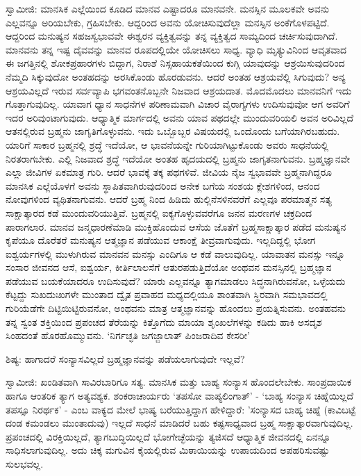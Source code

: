 ಸ್ವಾಮೀಜಿ: ಮಾನಸಿಕ ಎಲ್ಲೆಯಿಂದ ಕೂಡಿದ ಮಾನವ ಎಷ್ಟಾದರೂ ಮಾನವನೇ. ಮನಸ್ಸಿನ ಮೂಲಕವೇ ಅವನು ಎಲ್ಲವನ್ನೂ ಅರಿಯಬೇಕು, ಗ್ರಹಿಸಬೇಕು. ಆದ್ದರಿಂದ ಅವನು ಯೋಚಿಸುವುದೆಲ್ಲಾ ಮನಸ್ಸಿನ ಅಂಕೆಗೊಳಪಟ್ಟಿದೆ. ಆದ್ದರಿಂದ ಮನುಷ್ಯನ ಸಹಜಸ್ವಭಾವವೇ ಈಶ್ವರನ ವ್ಯಕ್ತಿತ್ವವನ್ನು ತನ್ನ ವ್ಯಕ್ತಿತ್ವದ ಸಾಮ್ಯದಿಂದ ಚರ್ಚಿಸುವುದಾಗಿದೆ. ಮಾನವನು ತನ್ನ ಇಷ್ಟ ದೈವವನ್ನು ಮಾನವ ರೂಪದಲ್ಲಿಯೇ ಯೋಚಿಸಲು ಸಾಧ್ಯ. ವ್ಯಾಧಿ ಮೃತ್ಯುವಿನಿಂದ ಆವೃತವಾದ ಈ ಜಗತ್ತಿನಲ್ಲಿ ಶೋಕಪ್ರಹಾರಗಳು ಬಿದ್ದಾಗ, ನಿರಾಶೆ ನಿಸ್ಸಹಾಯಕತೆಯಿಂದ ಕುಗ್ಗಿ ಯಾವುದನ್ನು ಆಶ್ರಯಿಸುವುದರಿಂದ ನೆಮ್ಮದಿ ಸಿಕ್ಕುವುದೋ ಅಂತಹದನ್ನು ಅರಸಿಕೊಂಡು ಹೊರಡುವನು. ಆದರೆ ಅಂತಹ ಆಶ್ರಯವೆಲ್ಲಿ ಸಿಗುವುದು? ಅನ್ಯ ಆಶ್ರಯವಿಲ್ಲದೆ ಇರುವ ಸರ್ವವ್ಯಾಪಿ ಭಗವಂತನೊಬ್ಬನೇ ನಿಜವಾದ ಆಶ್ರಯದಾತ. ಮೊದಮೊದಲು ಮಾನವನಿಗೆ ಇದು ಗೊತ್ತಾಗುವುದಿಲ್ಲ. ಯಾವಾಗ ಧ್ಯಾನ ಸಾಧನೆಗಳ ಪರಿಣಾಮವಾಗಿ ವಿಚಾರ ವೈರಾಗ್ಯಗಳು ಉದಿಸುವುವೋ ಆಗ ಅವರಿಗೆ ಇದರ ಅರಿವುಂಟಾಗುವುದು. ಆಧ್ಯಾತ್ಮಿಕ ಮಾರ್ಗದಲ್ಲಿ ಅವನು ಯಾವ ಪಥದಲ್ಲೇ ಮುಂದುವರಿಯಲಿ ಅವನ ಅರಿವಿಲ್ಲದೆ ಆತನಲ್ಲಿರುವ ಬ್ರಹ್ಮನು ಜಾಗೃತಿಗೊಳ್ಳುವನು. ಇದು ಒಬ್ಬೊಬ್ಬರ ವಿಷಯದಲ್ಲಿ ಒಂದೊಂದು ಬಗೆಯಾಗಿರಬಹುದು. ಯಾರಿಗೆ ಸಾಕಾರ ಬ್ರಹ್ಮನಲ್ಲಿ ಶ್ರದ್ಧೆ ಇದೆಯೋ, ಆ ಭಾವನೆಯನ್ನೇ ಗುರಿಯಾಗಿಟ್ಟುಕೊಂಡು ಅವರು ಸಾಧನೆಯಲ್ಲಿ ನಿರತರಾಗಬೇಕು. ಎಲ್ಲಿ ನಿಜವಾದ ಶ್ರದ್ಧೆ ಇದೆಯೋ ಅಂತಹ ಹೃದಯದಲ್ಲಿ ಬ್ರಹ್ಮನು ಜಾಗೃತನಾಗುವನು. ಬ್ರಹ್ಮಜ್ಞಾನವೇ ಎಲ್ಲಾ ಜೀವಿಗಳ ಏಕಮಾತ್ರ ಗುರಿ. ಆದರೆ ಭಾವಕ್ಕೆ ತಕ್ಕ ಪಥಗಳಿವೆ. ಜೀವಿಯ ನೈಜ ಸ್ವಭಾವವೇ ಬ್ರಹ್ಮನಾಗಿದ್ದರೂ ಮಾನಸಿಕ ಎಲ್ಲೆಯೊಳಗೆ ಅವನು ಸ್ಥಾಪಿತವಾಗಿರುವುದರಿಂದ ಅನೇಕ ಬಗೆಯ ಸಂಶಯ ಕ್ಲೇಶಗಳಿಂದ, ಆನಂದ ನೋವುಗಳಿಂದ ವ್ಯಥಿತನಾಗುವನು. ಆದರೆ ಬ್ರಹ್ಮ ನಿಂದ ಹಿಡಿದು ಹುಲ್ಲಿನೆಸಳಿನವರೆಗೆ ಎಲ್ಲವೂ ಪರಮಾತ್ಮನ ಸತ್ಯ ಸಾಕ್ಷಾತ್ಕಾರದ ಕಡೆ ಮುಂದುವರಿಯುತ್ತಿವೆ. ಬ್ರಹ್ಮನಲ್ಲಿ ಐಕ್ಯಗೊಳ್ಳುವವರೆಗೂ ಜನನ ಮರಣಗಳ ಚಕ್ರದಿಂದ ಪಾರಾಗಲಾರ. ಮಾನವ ಜನ್ಮಧಾರಣೆಮಾಡಿ ಮುಕ್ತಿಹೊಂದುವ ಆಸೆಯ ಜೊತೆಗೆ ಬ್ರಹ್ಮಸಾಕ್ಷಾತ್ಕಾರ ಪಡೆದ ಮನುಷ್ಯನ ಕೃಪೆಯೂ ದೊರೆತರೆ ಮನುಷ್ಯನ ಆತ್ಮಜ್ಞಾನ ಪಡೆಯುವ ಆಕಾಂಕ್ಷೆ ತೀವ್ರವಾಗುವುದು. ಇಲ್ಲದಿದ್ದಲ್ಲಿ ಭೋಗ ಐಶ್ವರ್ಯಗಳಲ್ಲಿ ಮುಳುಗಿರುವ ಮಾನವನ ಮನಸ್ಸು ಎಂದಿಗೂ ಆ ಕಡೆ ವಾಲುವುದಿಲ್ಲ. ಯಾವಾತನ ಮನಸ್ಸು ಇನ್ನೂ ಸಂಸಾರ ಜೀವನದ ಆಸೆ, ಐಶ್ವರ್ಯ, ಕೀರ್ತಿಲಾಲಸೆಗೆ ಆತುರಪಡುತ್ತಿದೆಯೋ ಅಂಥವನ ಮನಸ್ಸಿನಲ್ಲಿ ಬ್ರಹ್ಮಜ್ಞಾನ ಪಡೆಯುವ ಬಯಕೆಯಾದರೂ ಉದಿಸುವುದೆ? ಯಾರು ಎಲ್ಲವನ್ನೂ ತ್ಯಾಗಮಾಡಲು ಸಿದ್ಧನಾಗಿರುವನೋ, ಒಳ್ಳೆಯದು ಕೆಟ್ಟದ್ದು ಸುಖದುಃಖಗಳೇ ಮುಂತಾದ ದ್ವೈತ ಪ್ರವಾಹದ ಮಧ್ಯದಲ್ಲಿಯೂ ಶಾಂತವಾಗಿ ಸ್ಥಿರವಾಗಿ ಸಮಭಾವದಲ್ಲಿ ಗುರಿಯೆಡೆಗೇ ದಿಟ್ಟಿಯಿಟ್ಟಿರುವನೋ, ಅಂಥವನು ಮಾತ್ರ ಆತ್ಮಜ್ಞಾನವನ್ನು ಹೊಂದಲು ಪ್ರಯತ್ನಿಸುವನು. ಅಂತಹವನು ತನ್ನ ಸ್ವಂತ ಶಕ್ತಿಯಿಂದ ಪ್ರಪಂಚದ ತೆರೆಯನ್ನು ಕಿತ್ತೊಗೆದು ಮಾಯಾ ಶೃಂಖಲೆಗಳನ್ನು ಕಡಿದು ಹಾಕಿ ಅಸದೃಶ ಸಿಂಹದಂತೆ ಹೊರಹೊಮ್ಮುವನು. ‘ನಿರ್ಗಚ್ಛತಿ ಜಗಜ್ಜಾಲಾತ್ ಪಿಂಜರಾದಿವ ಕೇಸರೀ’

ಶಿಷ್ಯ: ಹಾಗಾದರೆ ಸಂನ್ಯಾಸವಿಲ್ಲದೆ ಬ್ರಹ್ಮಜ್ಞಾನವನ್ನು ಪಡೆಯಲಾಗುವುದೇ ಇಲ್ಲವೆ?

ಸ್ವಾಮೀಜಿ: ಖಂಡಿತವಾಗಿ ಸಾವಿರಬಾರಿಗೂ ಸತ್ಯ. ಮಾನಸಿಕ ಮತ್ತು ಬಾಹ್ಯ ಸಂನ್ಯಾಸ ಹೊಂದಲೇಬೇಕು. ಸಾಂಪ್ರದಾಯಿಕ ಹಾಗೂ ಆಂತರಿಕ ತ್ಯಾಗ ಅತ್ಯವಶ್ಯಕ. ಶಂಕರಾಚಾರ್ಯರು ‘ತಪಸೋ ವಾಪ್ಯಲಿಂಗಾತ್’ - ‘ಬಾಹ್ಯ ಸಂನ್ಯಾಸ ಚಿಹ್ನೆಯಿಲ್ಲದೆ ತಪಸ್ಸೂ ನಿರರ್ಥಕ’ - ಎಂಬ ವಾಕ್ಯದ ಮೇಲೆ ಭಾಷ್ಯ ಬರೆಯುತ್ತಿದ್ದಾಗ ಹೇಳಿದ್ದಾರೆ: 'ಸಂನ್ಯಾಸದ ಬಾಹ್ಯ ಚಿಹ್ನೆ (ಕಾವಿಬಟ್ಟೆ ದಂಡ ಕಮಂಡಲು ಮುಂತಾದುವು) ಇಲ್ಲದೆ ಸಾಧನೆ ಮಾಡಿದರೆ ಬಹು ಕಷ್ಟಸಾಧ್ಯವಾದ ಬ್ರಹ್ಮ ಸಾಕ್ಷಾತ್ಕಾರವಾಗುವುದಿಲ್ಲ. ಪ್ರಪಂಚದಲ್ಲಿ ವಿರಕ್ತಿಯಿಲ್ಲದೆ, ತ್ಯಾಗಬುದ್ಧಿಯಿಲ್ಲದೆ ಭೋಗೇಚ್ಛೆಯನ್ನು ತ್ಯಜಿಸದೆ ಆಧ್ಯಾತ್ಮಿಕ ಜೀವನದಲ್ಲಿ ಏನನ್ನೂ ಸಾಧಿಸಲಾಗುವುದಿಲ್ಲ. ಅದು ಚಿಕ್ಕ ಮಗುವಿನ ಕೈಯಲ್ಲಿರುವ ಮಿಠಾಯಿಯನ್ನು ಉಪಾಯದಿಂದ ಅಪಹರಿಸುವಷ್ಟು ಸುಲಭವಲ್ಲ.

